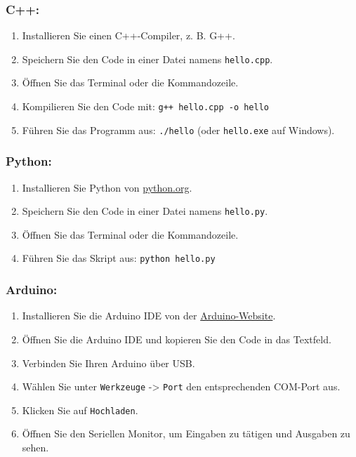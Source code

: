 \documentclass[12pt,a4paper]{scrartcl}
\newcommand{\tightlist}{
  \setlength{\itemsep}{0pt}\setlength{\parskip}{0pt}
}
\begin{document}
\hypertarget{c-1}{%
\subsubsection{C++:}\label{c-1}}

\begin{enumerate}
\def\labelenumi{\arabic{enumi}.}
\tightlist
\item
  Installieren Sie einen C++-Compiler, z. B. G++.
\item
  Speichern Sie den Code in einer Datei namens
  {\lstinline!hello.cpp!}.
\item
  Öffnen Sie das Terminal oder die Kommandozeile.
\item
  Kompilieren Sie den Code mit:
  {\lstinline!g++ hello.cpp -o hello!}
\item
  Führen Sie das Programm aus: {\lstinline!./hello!} (oder
  {\lstinline!hello.exe!} auf Windows).
\end{enumerate}

\hypertarget{python}{%
\subsubsection{Python:}\label{python}}

\begin{enumerate}
\def\labelenumi{\arabic{enumi}.}
\tightlist
\item
  Installieren Sie Python von
  \href{https://www.python.org/}{python.org}.
\item
  Speichern Sie den Code in einer Datei namens
  {\lstinline!hello.py!}.
\item
  Öffnen Sie das Terminal oder die Kommandozeile.
\item
  Führen Sie das Skript aus: {\lstinline!python hello.py!}
\end{enumerate}

\hypertarget{arduino}{%
\subsubsection{Arduino:}\label{arduino}}

\begin{enumerate}
\def\labelenumi{\arabic{enumi}.}
\tightlist
\item
  Installieren Sie die Arduino IDE von der
  \href{https://www.arduino.cc/}{Arduino-Website}.
\item
  Öffnen Sie die Arduino IDE und kopieren Sie den Code in das Textfeld.
\item
  Verbinden Sie Ihren Arduino über USB.
\item
  Wählen Sie unter {\lstinline!Werkzeuge!} -\textgreater{}
  {\lstinline!Port!} den entsprechenden COM-Port aus.
\item
  Klicken Sie auf {\lstinline!Hochladen!}.
\item
  Öffnen Sie den Seriellen Monitor, um Eingaben zu tätigen und Ausgaben
  zu sehen.
\end{enumerate}
\end{document}
